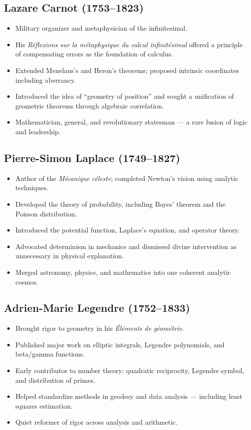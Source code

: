 \documentclass[9pt]{article}
\begin{document}
\subsection*{Lazare Carnot (1753–1823)}
\begin{itemize}
  \item Military organizer and metaphysician of the infinitesimal.
  \item His \textit{Réflexions sur la métaphysique du calcul infinitésimal} offered a principle of compensating errors as the foundation of calculus.
  \item Extended Menelaus’s and Heron’s theorems; proposed intrinsic coordinates including aberrancy.
  \item Introduced the idea of “geometry of position” and sought a unification of geometric theorems through algebraic correlation.
  \item Mathematician, general, and revolutionary statesman — a rare fusion of logic and leadership.
\end{itemize}

\subsection*{Pierre-Simon Laplace (1749–1827)}
\begin{itemize}
  \item Author of the \textit{Mécanique céleste}; completed Newton’s vision using analytic techniques.
  \item Developed the theory of probability, including Bayes' theorem and the Poisson distribution.
  \item Introduced the potential function, Laplace's equation, and operator theory.
  \item Advocated determinism in mechanics and dismissed divine intervention as unnecessary in physical explanation.
  \item Merged astronomy, physics, and mathematics into one coherent analytic cosmos.
\end{itemize}

\subsection*{Adrien-Marie Legendre (1752–1833)}
\begin{itemize}
  \item Brought rigor to geometry in his \textit{Éléments de géométrie}.
  \item Published major work on elliptic integrals, Legendre polynomials, and beta/gamma functions.
  \item Early contributor to number theory: quadratic reciprocity, Legendre symbol, and distribution of primes.
  \item Helped standardize methods in geodesy and data analysis — including least squares estimation.
  \item Quiet reformer of rigor across analysis and arithmetic.
\end{itemize}
\end{document}
